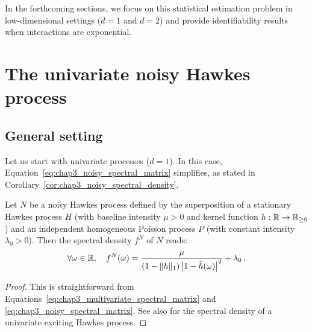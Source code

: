         In the forthcoming sections, we focus on this statistical estimation problem in low-dimensional settings ($d=1$ and $d=2$) and provide identifiability results when interactions are exponential.


      \section{The univariate noisy Hawkes process}\label{sec:chap3_univariate_noisy_hawkes}
        \subsection{General setting}
	        Let us start with univariate processes ($d=1$).
	        In this case, Equation~\eqref{eq:chap3_noisy_spectral_matrix} simplifies, as stated in Corollary~\ref{cor:chap3_noisy_spectral_density}.
          \begin{corollary}\label{cor:chap3_noisy_spectral_density}
	          Let $N$ be a noisy Hawkes process defined by the superposition of a stationary Hawkes process $H$
	          (with baseline intensity $\mu > 0$ and kernel function $h : {\mathbb R} \to {\mathbb R}_{\ge 0}$)
	          and an independent homogeneous Poisson process $P$ (with constant intensity $\lambda_0 > 0$).
	          Then the spectral density $f^N$ of $N$ reads:
	          \begin{equation*}
		          \forall \omega \in {\mathbb R}, \quad
		          f^N(\omega) = \frac{\mu}{\left(1 - \|h\|_1 \right) \left \lvert 1 - \tilde h(\omega) \right \rvert^2} + \lambda_0\,.
	          \end{equation*}
          \end{corollary}

          \begin{proof}
            This is straightforward from Equations~\eqref{eq:chap3_multivariate_spectral_matrix} and \eqref{eq:chap3_noisy_spectral_matrix}.
            See also \textcite[Example 8.2(e)]{DaleyV1} for the spectral density of a univariate exciting Hawkes process.
          \end{proof}
          
